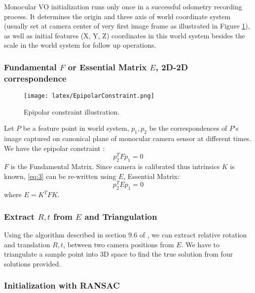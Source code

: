 \documentclass[10pt,twocolumn,letterpaper]{article}
\begin{document}
Monocular VO initialization runs only once in a successful odometry recording process. It determines the origin and three axis of world coordinate system (usually set at camera center of very first image frame as illustrated in Figure \ref{fig:figure3}), as well as initial features (X, Y, Z) coordinates in this world system besides the scale in the world system for follow up operations. 

\subsubsection{Fundamental $F$ or Essential Matrix $E$, 2D-2D correspondence}

\begin{figure}[h]
\texttt{[image: latex/EpipolarConstraint.png]}
\caption{Epipolar constraint illustration.}
\label{fig:figure3}
\end{figure}

Let $P$ be a feature point in world system, $p_1, p_2$ be the correspondences of $P$'s image captured on canonical plane of monocular camera sensor at different times. We have the epipolar constraint \cite{Hartley2004}:
\begin{equation} \label{eq:2}
p_2^T F p_1 = 0
\end{equation}
$F$ is the Fundamental Matrix. Since camera is calibrated thus intrinsics $K$ is known, \ref{eq:3} can be re-written using $E$, Essential Matrix:
\begin{equation} \label{eq:3}
p_2^T E p_1 = 0
\end{equation}
where $E=K^T F K$. 


\subsubsection{Extract $R, t$ from $E$ and Triangulation}

Using the algorithm described in section 9.6 of \cite{Hartley2004}, we can extract relative rotation and translation $R, t$, between two camera positions from $E$. We have to triangulate a sample point into 3D space to find the true solution from four solutions provided. 

\subsubsection{Initialization with RANSAC}
\end{document}
